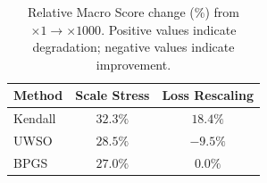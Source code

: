 \begin{table}[t]
\centering
\caption{Relative Macro Score change (\%) from $\times 1 \to \times 1000$. Positive values indicate degradation; negative values indicate improvement.}
\label{tab:degradation}
\begin{tabular}{l c c}
\toprule
Method & Scale Stress & Loss Rescaling \\
\midrule
Kendall & $32.3\%$ & $18.4\%$ \\
UWSO & $28.5\%$ & $\mathbf{-9.5\%}$ \\
BPGS & $\mathbf{27.0\%}$ & $0.0\%$ \\
\bottomrule
\end{tabular}
\end{table}
